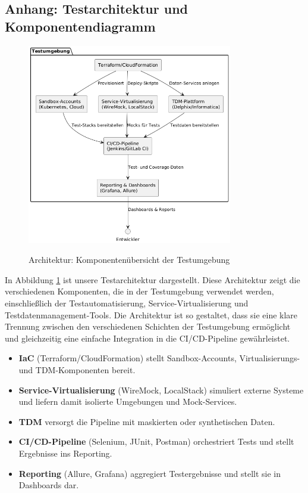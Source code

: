 \subsection{Anhang: Testarchitektur und Komponentendiagramm}
\begin{figure}[h!]
\centering
\caption{Architektur: Komponentenübersicht der Testumgebung}
    \includegraphics[width=0.8\textwidth]{fig/test_architecture_enviroment.png}
    \label{fig:architecture}
\end{figure} 
In Abbildung \ref{fig:architecture} ist unsere Testarchitektur dargestellt. Diese Architektur zeigt die verschiedenen Komponenten, die in der Testumgebung verwendet werden, einschließlich der Testautomatisierung, Service-Virtualisierung und Testdatenmanagement-Tools. Die Architektur ist so gestaltet, dass sie eine klare Trennung zwischen den verschiedenen Schichten der Testumgebung ermöglicht und gleichzeitig eine einfache Integration in die CI/CD-Pipeline gewährleistet.
\begin{itemize}
    \item \textbf{IaC}  (Terraform/CloudFormation) stellt Sandbox-Accounts, Virtualisierungs- und TDM-Komponenten bereit.
    \item \textbf{Service-Virtualisierung} (WireMock, LocalStack) simuliert externe Systeme und liefern damit isolierte Umgebungen und Mock-Services.
    \item \textbf{TDM} versorgt die Pipeline mit maskierten oder synthetischen Daten.
    \item \textbf{CI/CD-Pipeline} (Selenium, JUnit, Postman) orchestriert Tests und stellt Ergebnisse ins Reporting.
    \item \textbf{Reporting} (Allure, Grafana) aggregiert Testergebnisse und stellt sie in Dashboards dar.
\end{itemize}
